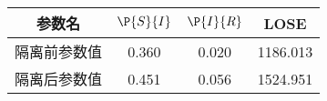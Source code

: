 \begin{tabular}{cccc}
\hline
参数名&$\P{S}{I}$&$\P{I}{R}$&LOSE\\
\hline
隔离前参数值&0.360&0.020&1186.013\\
隔离后参数值&0.451&0.056&1524.951\\
\hline
\end{tabular}